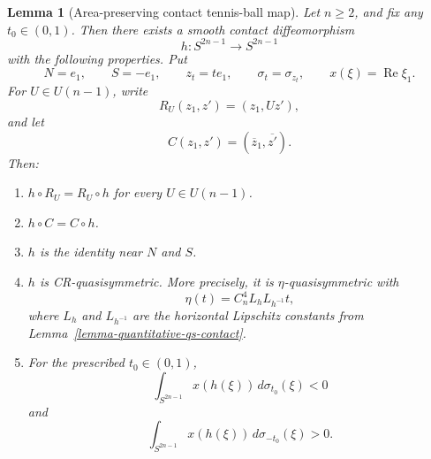 \documentclass[11pt]{article}
\newtheorem{lemma}[theorem]{Lemma}
\theoremstyle{definition}
\theoremstyle{remark}
\theoremstyle{definition}
\begin{document}
\begin{lemma}[Area-preserving contact tennis-ball map]
\label{lemma-contact-tennis-ball}
Let \(n\ge2\), and fix any \(t_0\in(0,1)\).  Then there exists a smooth
contact diffeomorphism
\[
        h:S^{2n-1}\to S^{2n-1}
\]
with the following properties.  Put
\[
        N=e_1,
        \qquad
        S=-e_1,
        \qquad
        z_t=te_1,
        \qquad
        \sigma_t=\sigma_{z_t},
        \qquad
        x(\xi)=\operatorname{Re}\xi_1.
\]
For \(U\in U(n-1)\), write
\[
        R_U(z_1,z')=(z_1,Uz'),
\]
and let
\[
        C(z_1,z')=(\overline z_1,\overline{z'}).
\]
Then:
\begin{enumerate}
\item \(h\circ R_U=R_U\circ h\) for every \(U\in U(n-1)\).
\item \(h\circ C=C\circ h\).
\item \(h\) is the identity near \(N\) and \(S\).
\item \(h\) is CR-quasisymmetric.  More precisely, it is
\(\eta\)-quasisymmetric with
\[
        \eta(t)=C_n^4L_hL_{h^{-1}}t,
\]
where \(L_h\) and \(L_{h^{-1}}\) are the horizontal Lipschitz constants from
Lemma~\ref{lemma-quantitative-qs-contact}.
\item For the prescribed \(t_0\in(0,1)\),
\[
        \int_{S^{2n-1}} x(h(\xi))\,d\sigma_{t_0}(\xi)<0
\]
and
\[
        \int_{S^{2n-1}} x(h(\xi))\,d\sigma_{-t_0}(\xi)>0.
\]
\end{enumerate}
\end{lemma}
\end{document}
